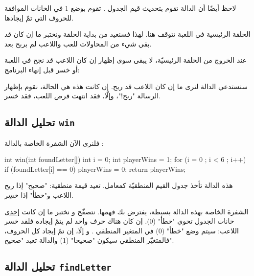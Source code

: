 \begin{information}
لاحظ أيضًا أن الدالة
تقوم بتحديث قيم الجدول
.
تقوم بوضع 1 في الخانات الموافقة للحروف التي تمّ إيجادها.
\end{information}

الحلقة الرئيسية في اللعبة تتوقف هنا. لهذا فسنعيد من بداية الحلقة ونختبر ما إن كان قد بقي شيء من المحاولات للعب واللاعب لم بربح بعد.

عند الخروج من الحلقة الرئيسيّة، لا يبقى سوى إظهار إن كان اللاعب قد نجح في اللعبة أو خسر قبل إنهاء البرنامج:

\begin{Csource}
if (win(foundLetter))
	printf("\n\nYou win ! the secret word is : %
else
	printf("\n\nYou lose ! the secret word is : %
return 0;
}
\end{Csource}

سنستدعي الدالة
لنرى ما إن كان اللاعب قد ربح. إن كانت هذه هي الحالة، نقوم بإظهار الرسالة "ربح!"، وإلّا، فقد انتهت فرص اللعب، فقد خسر.

\subsection{تحليل الدالة \texttt{win}}

فلنرى الآن الشفرة الخاصة بالدالة
:

\begin{Csource}
int win(int foundLetter[])
{
  int i = 0;
  int playerWins = 1;
  for (i = 0 ; i < 6 ; i++)
  {
    if (foundLetter[i] == 0)
    	playerWins = 0;
  }
  return playerWins;
}
\end{Csource}

هذه الدالة تأخذ جدول القيم المنطقيّة
كمعامل. تعيد قيمة منطقية: "صحيح" إذا ربح اللاعب و"خطأ" إذا خسِر.

الشفرة الخاصة بهذه الدالة بسيطة، يفترض بك فهمها. نتصفّح
و نختبر ما إن كانت
\underline{إحدى}
خانات الجدول تحوي "خطأ" (0). إن كان هناك حرف واحد لم يتمّ إيجاده فلقد خسر اللاعب: سيتم وضع "خطأ" (0) في المتغير المنطقي
.
و إلّا، إن تمّ إيجاد كل الحروف، فالمتغيّر المنطقي سيكون "صحيحا" (1) والدالة تعيد "صحيح".

\subsection{تحليل الدالة \texttt{findLetter}}

